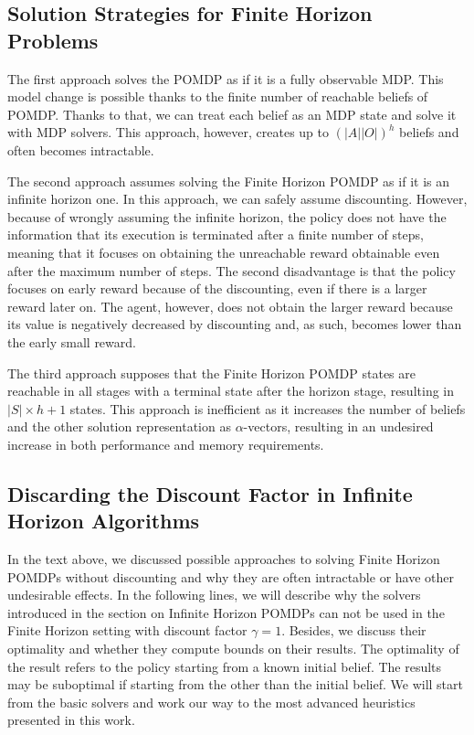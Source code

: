 \subsection{Solution Strategies for Finite Horizon Problems}

The first approach solves the POMDP as if it is a fully observable MDP. This model change is possible thanks to the finite number of reachable beliefs of POMDP. Thanks to that, we can treat each belief as an MDP state and solve it with MDP solvers. This approach, however, creates up to $(|A||O|)^h$ beliefs and often becomes intractable.

The second approach assumes solving the Finite Horizon POMDP as if it is an infinite horizon one. In this approach, we can safely assume discounting. However, because of wrongly assuming the infinite horizon, the policy does not have the information that its execution is terminated after a finite number of steps, meaning that it focuses on obtaining the unreachable reward obtainable even after the maximum number of steps. The second disadvantage is that the policy focuses on early reward because of the discounting, even if there is a larger reward later on. The agent, however, does not obtain the larger reward because its value is negatively decreased by discounting and, as such, becomes lower than the early small reward.

The third approach supposes that the Finite Horizon POMDP states are reachable in all stages with a terminal state after the horizon stage, resulting in $|S| \times h + 1$ states. This approach is inefficient as it increases the number of beliefs and the other solution representation as $\alpha$-vectors, resulting in an undesired increase in both performance and memory requirements.




\subsection{Discarding the Discount Factor in Infinite Horizon Algorithms}


In the text above, we discussed possible approaches to solving Finite Horizon POMDPs without discounting and why they are often intractable or have other undesirable effects. In the following lines, we will describe why the solvers introduced in the section on Infinite Horizon POMDPs can not be used in the Finite Horizon setting with discount factor $\gamma = 1$. Besides, we discuss their optimality and whether they compute bounds on their results. The optimality of the result refers to the policy starting from a known initial belief. The results may be suboptimal if starting from the other than the initial belief. We will start from the basic solvers and work our way to the most advanced heuristics presented in this work.


